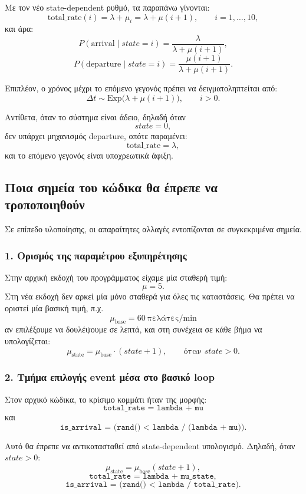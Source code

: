 \documentclass{article}
\begin{document}
Με τον νέο state-dependent ρυθμό, τα παραπάνω γίνονται:
\[
\text{total\_rate}(i)=\lambda+\mu_i=\lambda+\mu(i+1), \qquad i=1,\ldots,10,
\]
και άρα:
\[
P(\text{arrival} \mid state=i)=\frac{\lambda}{\lambda+\mu(i+1)},
\]
\[
P(\text{departure} \mid state=i)=\frac{\mu(i+1)}{\lambda+\mu(i+1)}.
\]

Επιπλέον, ο χρόνος μέχρι το επόμενο γεγονός πρέπει να δειγματοληπτείται από:
\[
\Delta t \sim \mathrm{Exp}\bigl(\lambda+\mu(i+1)\bigr), \qquad i>0.
\]

Αντίθετα, όταν το σύστημα είναι άδειο, δηλαδή όταν
\[
state=0,
\]
δεν υπάρχει μηχανισμός departure, οπότε παραμένει:
\[
\text{total\_rate} = \lambda,
\]
και το επόμενο γεγονός είναι υποχρεωτικά άφιξη.

\subsection{Ποια σημεία του κώδικα θα έπρεπε να τροποποιηθούν}

Σε επίπεδο υλοποίησης, οι απαραίτητες αλλαγές εντοπίζονται σε συγκεκριμένα σημεία.

\subsubsection*{1. Ορισμός της παραμέτρου εξυπηρέτησης}

Στην αρχική εκδοχή του προγράμματος είχαμε μία σταθερή τιμή:
\[
\mu = 5.
\]
Στη νέα εκδοχή δεν αρκεί μία μόνο σταθερά για όλες τις καταστάσεις. Θα πρέπει να οριστεί μία βασική τιμή, π.χ.
\[
\mu_{\text{base}} = 60 \ \text{πελάτες/min}
\]
αν επιλέξουμε να δουλέψουμε σε λεπτά, και στη συνέχεια σε κάθε βήμα να υπολογίζεται:
\[
\mu_{\text{state}} = \mu_{\text{base}} \cdot (state+1), \qquad \text{όταν } state>0.
\]

\subsubsection*{2. Τμήμα επιλογής event μέσα στο βασικό loop}

Στον αρχικό κώδικα, το κρίσιμο κομμάτι ήταν της μορφής:
\[
\texttt{total\_rate = lambda + mu}
\]
και
\[
\texttt{is\_arrival = (rand() < lambda / (lambda + mu))}.
\]

Αυτό θα έπρεπε να αντικατασταθεί από state-dependent υπολογισμό. Δηλαδή, όταν $state>0$:
\[
\mu_{\text{state}} = \mu_{\text{base}}(state+1),
\]
\[
\texttt{total\_rate = lambda + mu\_state},
\]
\[
\texttt{is\_arrival = (rand() < lambda / total\_rate)}.
\]
\end{document}
